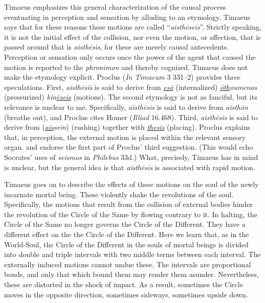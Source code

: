 Timaeus emphasizes this general characterization of the causal process eventuating in perception and sensation by alluding to an etymology. Timaeus says that for these reasons these motions are called ``\emph{aisthēseis}''. Strictly speaking, it is not the initial effect of the collision, nor even the motion, or affection, that is passed around that is \emph{aisthēsis}, for these are merely causal antecedents. Perception or sensation only occurs once the power of the agent that caused the motion is reported to the \emph{phronimon} and thereby cognized. Timaeus does not make the etymology explicit. Proclus (\emph{In Timaeum} 3 331--2) provides three speculations. First, \emph{aisthēsis} is said to derive from \emph{\underline{esō}} (internalized) \emph{\underline{ōth}oumenas} (pressurized) \emph{kin\underline{ēseis}} (motions). The second etymology is not as fanciful, but its relevance is unclear to me. Specifically, \emph{aisthēsis} is said to derive from \emph{aisthōn} (breathe out), and Proclus cites Homer (\emph{Illiad} 16.468). Third, \emph{aisthēsis} is said to derive from (\emph{\underline{ais}sein}) (rushing) together with \emph{\underline{thesis}} (placing). Proclus explains that, in perception, the external motion is placed within the relevant sensory organ. \citet[149 n14]{Archer-Hind:1888qd} and \citet[94 n2]{Bury:1929jb} endorse the first part of Proclus' third suggestion. (This would echo Socrates' uses of \emph{seismos} in \emph{Philebus} 33d.) What, precisely, Timaeus has in mind is unclear, but the general idea is that \emph{aisthēsis} is associated with rapid motion.

Timaeus goes on to describe the effects of these motions on the soul of the newly incarnate mortal being. These violently shake the revolutions of the soul. Specifically, the motions that result from the collision of external bodies hinder the revolution of the Circle of the Same by flowing contrary to it. In halting, the Circle of the Same no longer governs the Circle of the Different. They have a different effect on the the Circle of the Different. Here we learn that, as in the World-Soul, the Circle of the Different in the souls of mortal beings is divided into double and triple intervals with two middle terms between each interval. The externally induced motions cannot undue these. The intervals are proportional bonds, and only that which bound them may render them asunder. Nevertheless, these are distorted in the shock of impact. As a result, sometimes the Circle moves in the opposite direction, sometimes sideways, sometimes upside down. 

